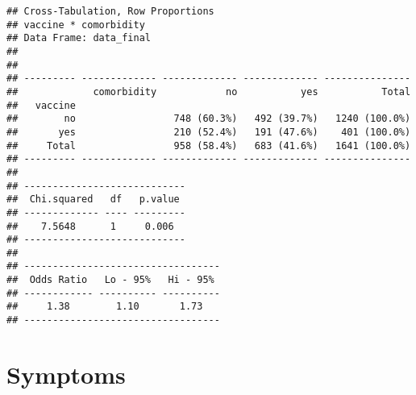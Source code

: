 \documentclass[
]{article}
\begin{document}
\begin{verbatim}
## Cross-Tabulation, Row Proportions  
## vaccine * comorbidity  
## Data Frame: data_final  
## 
## 
## --------- ------------- ------------- ------------- ---------------
##             comorbidity            no           yes           Total
##   vaccine                                                          
##        no                 748 (60.3%)   492 (39.7%)   1240 (100.0%)
##       yes                 210 (52.4%)   191 (47.6%)    401 (100.0%)
##     Total                 958 (58.4%)   683 (41.6%)   1641 (100.0%)
## --------- ------------- ------------- ------------- ---------------
## 
## ----------------------------
##  Chi.squared   df   p.value 
## ------------- ---- ---------
##    7.5648      1     0.006  
## ----------------------------
## 
## ----------------------------------
##  Odds Ratio   Lo - 95%   Hi - 95% 
## ------------ ---------- ----------
##     1.38        1.10       1.73   
## ----------------------------------
\end{verbatim}

\hypertarget{symptoms}{%
\section{Symptoms}\label{symptoms}}
\end{document}
